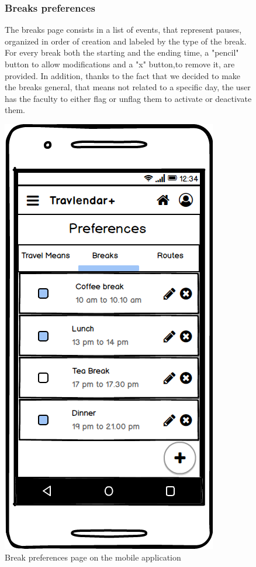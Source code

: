 		\begin{figure}
				\begin{flushleft}
				\subsubsection{Breaks preferences}
				The breaks page consists in a list of events, that represent pauses, organized in order of creation and labeled by the type of the break. For every break  both the starting and the ending time, a "pencil" button to allow modifications and a "x" button,to remove it, are provided. In addition, thanks to the fact that we decided to make the breaks general, that means not related to a specific day, the user has the faculty to either flag or unflag them to activate or deactivate them. 
			\end{flushleft}
		\centering
		\includegraphics[width=0.6\linewidth]{mockups/PreferencesBreaks}
		\caption{Break preferences page on the mobile application}
		\label{fig:preferencesbreaks}
	\end{figure}

